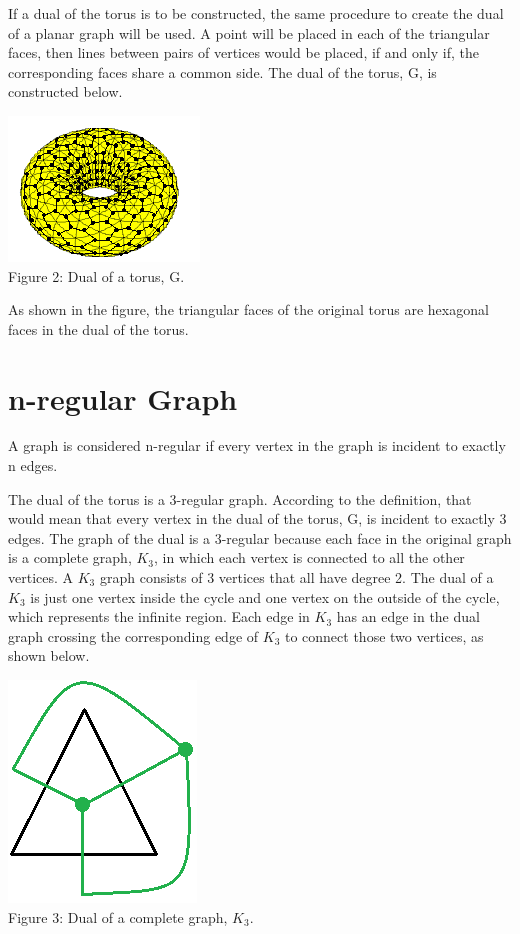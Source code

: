 \documentclass[12pt]{article}
\begin{document}
\begin{flushleft}
\medskip
If a dual of the torus is to be constructed, the same procedure to create the dual of a planar graph will be used. A point will be placed in each of the triangular faces, then lines between pairs of vertices would be placed, if and only if, the corresponding faces share a common side. The dual of the torus, G, is constructed below.

\begin{center}
\includegraphics[scale=1.25]{images/torusdual.png}\\
Figure 2: Dual of a torus, G.
\end{center}

As shown in the figure, the triangular faces of the original torus are hexagonal faces in the dual of the torus.

\section*{n-regular Graph}
A graph is considered n-regular if every vertex in the graph is incident to exactly n edges.

\medskip
The dual of the torus is a 3-regular graph. According to the definition, that would mean that every vertex in the dual of the torus, G, is incident to exactly 3 edges. The graph of the dual is a 3-regular because each face in the original graph is a complete graph, $K_3$, in which each vertex is connected to all the other vertices. A $K_3$ graph consists of 3 vertices that all have degree 2. The dual of a $K_3$ is just one vertex inside the cycle and one vertex on the outside of the cycle, which represents the infinite region. Each edge in $K_3$ has an edge in the dual graph crossing the corresponding edge of $K_3$ to connect those two vertices, as shown below.

\begin{center}
\includegraphics[scale=1]{images/k3dual.png}\\
Figure 3: Dual of a complete graph, $K_3$.
\end{center}


\end{flushleft}
\end{document}

